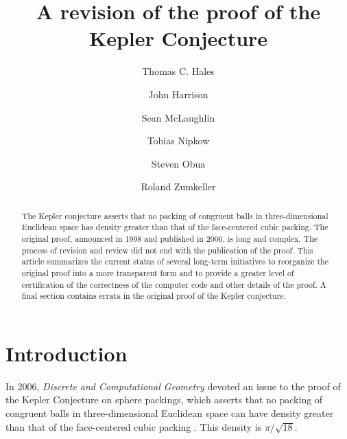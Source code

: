 \documentclass[11pt]{amsart}
\begin{document}
\title{A revision of the proof of the Kepler Conjecture}

\author[Hales]{Thomas C. Hales}
\address[T.~Hales]{Math Department, University of Pittsburgh}

\author[Harrison]{John Harrison}
\address[J.~Harrison]{Intel Corporation,  JF1-13, 2111 NE 25th Avenue
 Hillsboro, OR 97124
 USA}

\author[McLaughlin]{Sean McLaughlin}
\address[S.~McLaughlin]{Carnegie Mellon University}

\author[Nipkow]{Tobias Nipkow}
\address[T.~Nipkow]{Department for Informatics, Technische Universit\"at
M\"unchen}

\author[Obua]{Steven Obua}
\address[S.~Obua]{Department for Informatics, Technische Universit\"at
M\"unchen}

\author[Zumkeller]{Roland Zumkeller}
\address[R.~Zumkeller]{\'Ecole Polytechnique, Paris}

\begin{abstract}
The Kepler conjecture asserts that no packing of congruent balls in three-dimensional Euclidean space 
has density greater than that of the face-centered cubic packing.  The original proof,
announced in 1998 and published in 2006, is long and complex. The process of  revision and review did not end with the publication of the proof.
This article summarizes the current status of several long-term initiatives to
reorganize the original proof into a more transparent form and to provide a greater
level of certification of the correctness of the computer code and other details of the proof.
A final section contains errata in the original proof of the Kepler conjecture.
\end{abstract}


\maketitle

\section{Introduction}

In 2006, {\it Discrete and Computational Geometry} devoted an issue to the
proof of the Kepler Conjecture on sphere packings, which asserts that no
packing of congruent balls in three-dimensional Euclidean space can
have density greater than that of the face-centered cubic packing \cite{Hales:2006:DCG}.
This density is $\pi/\sqrt{18}$.
\end{document}
